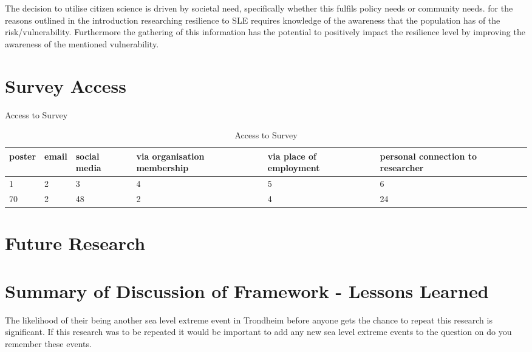 The decision to utilise citizen science is driven by societal need, specifically whether this fulfils policy needs or community needs. for the reasons outlined in the introduction researching resilience to SLE requires knowledge of the awareness that the population has of the risk/vulnerability. Furthermore the gathering of this information has the potential to positively impact the resilience level by improving the awareness of the mentioned vulnerability. 

\section{Survey Access}

\begin{table}[!ht]
    \centering
    \caption{Access to Survey}
    \begin{tabular}{|l|l|l|l|l|l|}
    \hline
      poster & email & social media & via organisation membership & via place of employment & personal connection to researcher \\ \hline
        1 & 2 & 3 & 4 & 5 & 6 \\ \hline
        70 & 2 & 48 & 2 & 4 & 24 \\ \hline
    \end{tabular}
      \caption{Access to Survey}
      \label{access_survey}
\end{table}

\section{Future Research}

\section{Summary of Discussion of Framework - Lessons Learned}


The likelihood of their being another sea level extreme event in Trondheim before anyone gets the chance to repeat this research is significant. If this research was to be repeated it would be important to add any new sea level extreme events to the question on do you remember these events. 